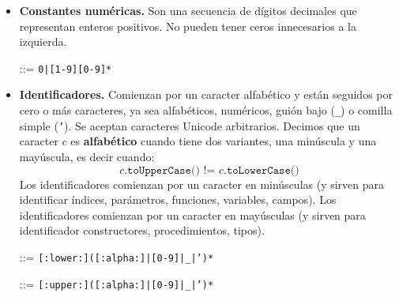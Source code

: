 \documentclass{article}
\begin{document}
\begin{itemize}

\item {\bf Constantes num\'ericas.}
  Son una secuencia de d\'igitos decimales que representan enteros positivos.
  No pueden tener ceros innecesarios a la izquierda.
  \begin{center}
     ::= \texttt{0|[1-9][0-9]*}
  \end{center}

\item {\bf Identificadores.}
  Comienzan por un caracter alfab\'etico y
  est\'an seguidos por cero o m\'as caracteres,
  ya sea alfab\'eticos, num\'ericos, gui\'on bajo (\texttt{\_}) o comilla simple (\texttt{'}).
  Se aceptan caracteres Unicode arbitrarios. Decimos que un caracter $c$ es {\bf alfab\'etico}
  cuando tiene dos variantes, una min\'uscula y una may\'uscula, es decir cuando:
  \[
  \texttt{$c$.toUpperCase() != $c$.toLowerCase()}
  \]
  Los identificadores  comienzan por un caracter en min\'usculas
  (y sirven para identificar \'indices, par\'ametros, funciones, variables, campos).
  Los identificadores  comienzan por un caracter en may\'usculas
  (y sirven para identificador constructores, procedimientos, tipos).
  \begin{center}
     ::= \texttt{[:lower:]([:alpha:]|[0-9]|\_|')*}
  \end{center}
  \begin{center}
     ::= \texttt{[:upper:]([:alpha:]|[0-9]|\_|')*}
  \end{center}


\end{itemize}
\end{document}

